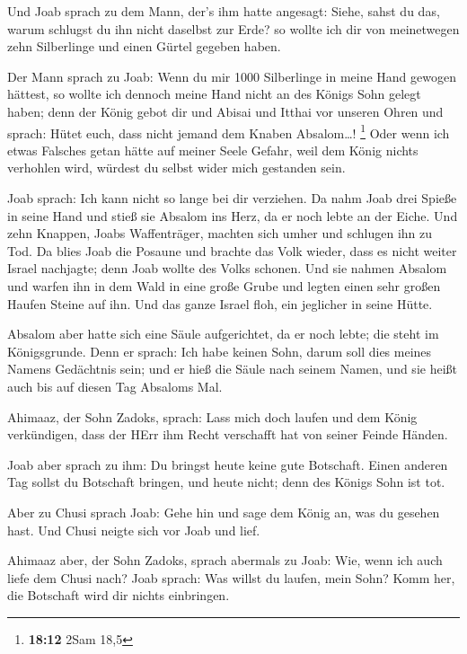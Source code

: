  Und Joab sprach zu dem Mann, der's ihm hatte angesagt:
Siehe, sahst du das, warum schlugst du ihn nicht daselbst zur Erde? so
wollte ich dir von meinetwegen zehn Silberlinge und einen Gürtel gegeben
haben.

 Der Mann sprach zu Joab: Wenn du mir 1000 Silberlinge in
meine Hand gewogen hättest, so wollte ich dennoch meine Hand nicht an
des Königs Sohn gelegt haben; denn der König gebot dir und Abisai und
Itthai vor unseren Ohren und sprach: Hütet euch, dass nicht jemand dem
Knaben Absalom\ldots! \footnote{\textbf{18:12} 2Sam 18,5} 
Oder wenn ich etwas Falsches getan hätte auf meiner Seele Gefahr, weil
dem König nichts verhohlen wird, würdest du selbst wider mich gestanden
sein.

 Joab sprach: Ich kann nicht so lange bei dir verziehen. Da
nahm Joab drei Spieße in seine Hand und stieß sie Absalom ins Herz, da
er noch lebte an der Eiche.  Und zehn Knappen, Joabs
Waffenträger, machten sich umher und schlugen ihn zu Tod. 
Da blies Joab die Posaune und brachte das Volk wieder, dass es nicht
weiter Israel nachjagte; denn Joab wollte des Volks schonen.
 Und sie nahmen Absalom und warfen ihn in dem Wald in eine
große Grube und legten einen sehr großen Haufen Steine auf ihn. Und das
ganze Israel floh, ein jeglicher in seine Hütte.

 Absalom aber hatte sich eine Säule aufgerichtet, da er
noch lebte; die steht im Königsgrunde. Denn er sprach: Ich habe keinen
Sohn, darum soll dies meines Namens Gedächtnis sein; und er hieß die
Säule nach seinem Namen, und sie heißt auch bis auf diesen Tag Absaloms
Mal.

 Ahimaaz, der Sohn Zadoks, sprach: Lass mich doch laufen
und dem König verkündigen, dass der HErr ihm Recht verschafft hat von
seiner Feinde Händen.

 Joab aber sprach zu ihm: Du bringst heute keine gute
Botschaft. Einen anderen Tag sollst du Botschaft bringen, und heute
nicht; denn des Königs Sohn ist tot.

 Aber zu Chusi sprach Joab: Gehe hin und sage dem König an,
was du gesehen hast. Und Chusi neigte sich vor Joab und lief.

 Ahimaaz aber, der Sohn Zadoks, sprach abermals zu Joab:
Wie, wenn ich auch liefe dem Chusi nach? Joab sprach: Was willst du
laufen, mein Sohn? Komm her, die Botschaft wird dir nichts einbringen.


